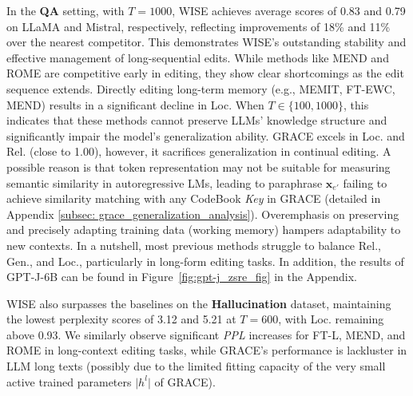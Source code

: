 \documentclass{article}
\begin{document}
In the \textbf{QA} setting, with $T=1000$, WISE achieves average scores of 0.83 and 0.79 on LLaMA and Mistral, respectively, reflecting improvements of 18\% and 11\% over the nearest competitor.
This demonstrates WISE's outstanding stability and effective management of long-sequential edits. 
While methods like MEND and ROME are competitive early in editing, they show clear shortcomings as the edit sequence extends.
Directly editing long-term memory (e.g., MEMIT, FT-EWC, MEND) results in a significant decline in Loc. When $T \in \{100, 1000\}$, this indicates that these methods cannot preserve LLMs' knowledge structure and significantly impair the model's generalization ability. 
GRACE excels in Loc. and Rel. (close to 1.00), however, it sacrifices generalization in continual editing.
A possible reason is that token representation may not be suitable for measuring semantic similarity in autoregressive LMs, leading to paraphrase $\mathbf{x}_{e'}$ failing to achieve similarity matching with any CodeBook \textit{Key} in GRACE (detailed in Appendix \ref{subsec: grace_generalization_analysis}).
Overemphasis on preserving and precisely adapting training data (working memory) hampers adaptability to new contexts.
In a nutshell, most previous methods struggle to balance Rel., Gen., and Loc., particularly in long-form editing tasks. In addition, the results of GPT-J-6B can be found in Figure~\ref{fig:gpt-j_zsre_fig} in the Appendix.

WISE also surpasses the baselines on the \textbf{Hallucination} dataset, maintaining the lowest perplexity scores of 3.12 and 5.21 at $T=600$, with Loc. remaining above 0.93. We similarly observe significant \textit{PPL} increases for FT-L, MEND, and ROME in long-context editing tasks, while GRACE's performance is lackluster in LLM long texts (possibly due to the limited fitting capacity of the very small active trained parameters $\vert h^l \vert$ of GRACE).
\end{document}
